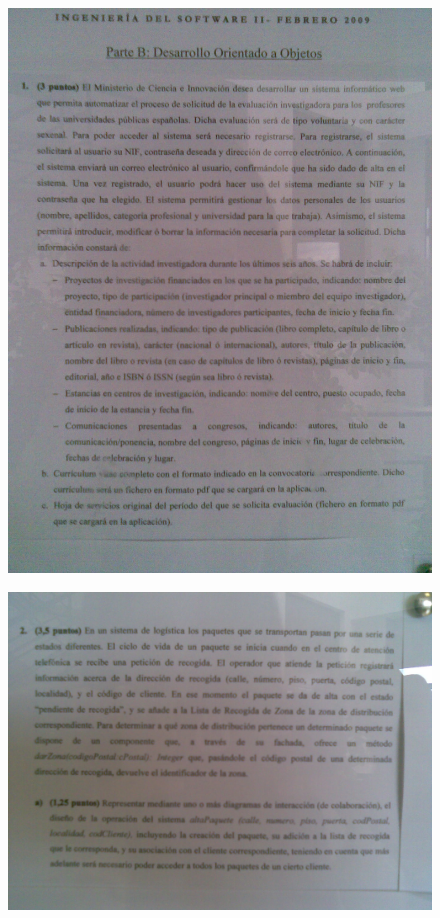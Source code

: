 \documentclass[12pt,a4paper]{report}
\begin{document}
\begin{figure}
  \includegraphics[width=\textwidth]{./images/jun/Imagen078.jpg}
\end{figure}
\begin{figure}
  \includegraphics[width=\textwidth]{./images/jun/Imagen082.jpg}
\end{figure}
\end{document}
